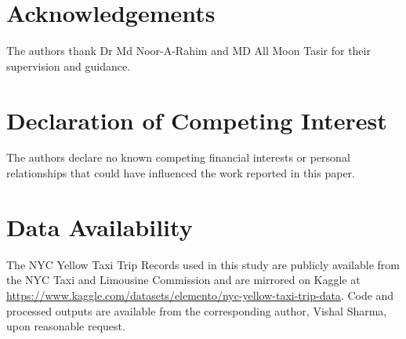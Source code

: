 \documentclass[a4paper,fleqn]{cas-dc}
\begin{document}
\section*{Acknowledgements}
The authors thank Dr Md Noor-A-Rahim and MD All Moon Tasir for their supervision and guidance.

\section*{Declaration of Competing Interest}
The authors declare no known competing financial interests or personal relationships that could have influenced the work reported in this paper.

\section*{Data Availability}
The NYC Yellow Taxi Trip Records used in this study are publicly available from the NYC Taxi and Limousine Commission and are mirrored on Kaggle at \url{https://www.kaggle.com/datasets/elemento/nyc-yellow-taxi-trip-data}.  Code and processed outputs are available from the corresponding author, Vishal Sharma, upon reasonable request.



\end{document}
